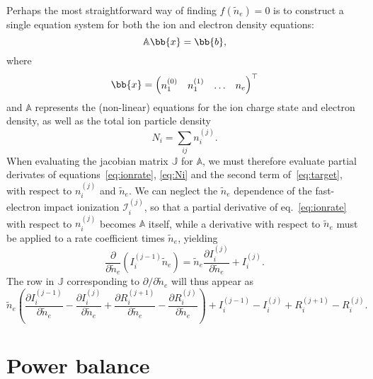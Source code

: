 \documentclass{notes}
\begin{document}
	Perhaps the most straightforward way of finding $f(\tilde{n}_e)=0$ is to
	construct a single equation system for both the ion and electron density
	equations:
	\begin{equation}
		\mathbb{A}\bb{x} = \bb{b},
	\end{equation}
	where
	\begin{equation}
		\bb{x} =
		\begin{pmatrix}
			n_1^{(0)} & n_1^{(1)} & \ldots & n_e
		\end{pmatrix}^\top
	\end{equation}
	and $\mathbb{A}$ represents the (non-linear) equations for the ion charge
	state and electron density, as well as the total ion particle density
	\begin{equation}\label{eq:Ni}
		N_i = \sum_{ij} n_i^{(j)}.
	\end{equation}
	When evaluating the jacobian matrix $\mathbb{J}$ for $\mathbb{A}$, we must
	therefore evaluate partial derivates of equations~\eqref{eq:ionrate},
	\eqref{eq:Ni} and the second term of~\eqref{eq:target}, with respect to
	$n_i^{(j)}$ and $\tilde{n}_e$. We can neglect the $\tilde{n}_e$ dependence
	of the fast-electron impact ionization $\mathcal{I}_i^{(j)}$, so that a
	partial derivative of eq.~\eqref{eq:ionrate} with respect to $n_i^{(j)}$
	becomes $\mathbb{A}$ itself, while a derivative with respect to
	$\tilde{n}_e$ must be applied to a rate coefficient times $\tilde{n}_e$,
	yielding
	\begin{equation}
		\frac{\partial}{\partial\tilde{n}_e}\left( I_i^{(j-1)}\tilde{n}_e \right)
		=
		\tilde{n}_e
		\frac{\partial I_i^{(j)}}{\partial\tilde{n}_e} +
		I_i^{(j)}.
	\end{equation}
	The row in $\mathbb{J}$ corresponding to $\partial/\partial\tilde{n}_e$ will
	thus appear as
	\begin{equation}
		\tilde{n}_e\left(
			\frac{\partial I_i^{(j-1)}}{\partial\tilde{n}_e} -
			\frac{\partial I_i^{(j)}}{\partial\tilde{n}_e} +
			\frac{\partial R_i^{(j+1)}}{\partial\tilde{n}_e} -
			\frac{\partial R_i^{(j)}}{\partial\tilde{n}_e}
		\right)
		+
		I_i^{(j-1)} - I_i^{(j)} + R_i^{(j+1)} - R_i^{(j)}.
	\end{equation}

	\section{Power balance}
\end{document}
